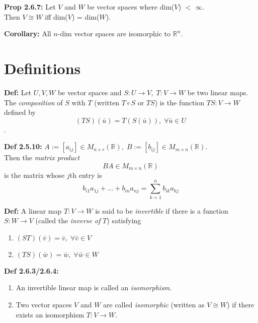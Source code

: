 \bigskip 

\noindent
\textbf{Prop 2.6.7:} Let $V$ and $W$ be vector spaces where dim($V$) $<$ $\infty$. \\ 
Then $V \cong W$ iff dim($V$) = dim($W$). 

\bigskip 

\noindent 
\textbf{Corollary:} All $n$-dim vector spaces are isomorphic to $\mathbb{R}^n$. 

\pagebreak

\section*{Definitions} 

\textbf{Def:} Let $U,V,W$ be vector spaces and $S: U \rightarrow V, \; T: V \rightarrow W$ be two linear maps. 
The \textit{composition} of $S$ with $T$ (written $T \circ S$ or $TS$) is the function $TS: V \rightarrow W$ defined by 
\[(TS)(\bar u) = T(S(\bar u)), \; \forall \bar u \in U\].

\noindent 
\textbf{Def 2.5.10:} $A := [a_{ij}] \in M_{n \times r}(\mathbb{R}), \; B := [b_{ij}] \in M_{m \times n}(\mathbb{R})$. \\
Then the \textit{matrix product} \\ 
\[BA \in M_{m \times n}(\mathbb{R})\]  
 is the matrix whose $j$th entry is 
\[b_{i1}a_{1j} + \ldots + b_{in}a_{nj} = \sum_{k = 1}^{n} b_{ik}a_{kj} \] 

\bigskip 

\noindent
\textbf{Def:} A linear map $T: V \rightarrow W$ is said to be \textit{invertible} if there is a function $S: W \rightarrow V$ (called the \textit{inverse of }$T$) satisfying 
\begin{enumerate}
    \item $(ST)(\bar v) = \bar v, \; \forall \bar v \in V$
    \item $(TS)(\bar w) = \bar w, \; \forall \bar w \in W$
\end{enumerate}

\bigskip 

\noindent 
\textbf{Def 2.6.3/2.6.4:} 
\begin{enumerate}
    \item An invertible linear map is called an \textit{isomorphism}. 
    \item Two vector spaces $V$ and $W$ are called \textit{isomorphic} (written as $V \cong W$) if there exists an isomorphism $T: V \rightarrow W$.
\end{enumerate}